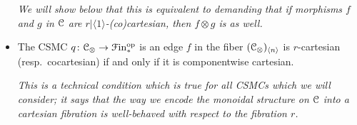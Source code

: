 \documentclass[main.tex]{subfiles}
\begin{document}
\begin{definition}
\begin{itemize}
      \textit{We will show below that this is equivalent to demanding that if morphisms $f$ and $g$ in $\mathcal{C}$ are $r|\langle 1 \rangle$-(co)cartesian, then $f \otimes g$ is as well.}

    \item The CSMC $q\colon \mathcal{C}_{\otimes} \to \mathcal{F}\mathrm{in}_{*}^{\mathrm{op}}$ is  an edge $f$ in the fiber $(\mathcal{C}_{\otimes})_{\langle n \rangle}$ is $r$-cartesian (resp.\ cocartesian) if and only if it is componentwise cartesian.

      \textit{This is a technical condition which is true for all CSMCs which we will consider; it says that the way we encode the monoidal structure on $\mathcal{C}$ into a cartesian fibration is well-behaved with respect to the fibration $r$.}
  \end{itemize}
\end{definition}
\end{document}
